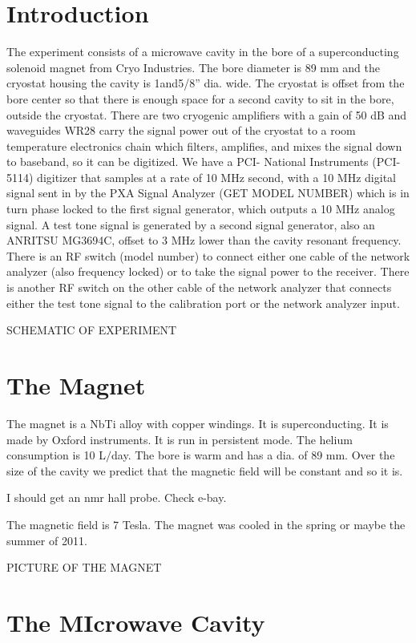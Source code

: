 \documentclass[11pt]{article}
\begin{document}
\section{Introduction}

The experiment consists of a microwave cavity in the bore of a superconducting solenoid magnet from Cryo Industries. The bore diameter is 89 mm and the cryostat housing the cavity is 1and5/8” dia. wide. The cryostat is offset from the bore center so that there is enough space for a second cavity to sit in the bore, outside the cryostat. There are two cryogenic amplifiers with a gain of 50 dB and waveguides WR28 carry the signal power out of the cryostat to a room temperature electronics chain which filters, amplifies, and mixes the signal down to baseband, so it can be digitized. We have a PCI- National Instruments (PCI-5114) digitizer that samples at a rate of 10 MHz second, with a 10 MHz digital signal sent in by the PXA Signal Analyzer (GET MODEL NUMBER) which is in turn phase locked to the first signal generator, which outputs a 10 MHz analog signal. A test tone signal is generated by a second signal generator, also an ANRITSU MG3694C, offset to 3 MHz lower than the cavity resonant frequency. There is an RF switch (model number) to connect either one cable of the network analyzer (also frequency locked) or to take the signal power to the receiver. There is another RF switch on the other cable of the network analyzer that connects either the test tone signal to the calibration port or the network analyzer input. 

SCHEMATIC OF EXPERIMENT

\section{The Magnet}

The magnet is a NbTi alloy with copper windings. It is superconducting. It is made by Oxford instruments. It is run in persistent mode. The helium consumption is 10 L$/$day. The bore is warm and has a dia. of 89 mm.
Over the size of the cavity we predict that the magnetic field will be constant and so it is.

I should get an nmr hall probe. Check e-bay.

The magnetic field is 7 Tesla. The magnet was cooled in the spring or maybe the summer of 2011. 

PICTURE OF THE MAGNET

\section{The MIcrowave Cavity}
\end{document}
